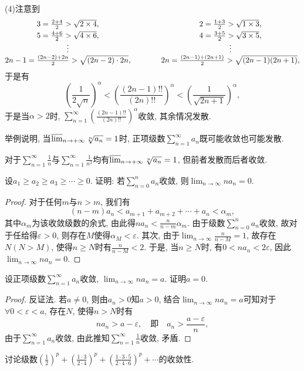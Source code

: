 \begin{quiza}
\begin{solution}
(4)注意到\[\begin{matrix}\vspace{3pt}
3=\frac{2+4}{2}>\sqrt{2\times 4},&\qquad &2=\frac{1+3}{2}>\sqrt{1\times 3},\\
5=\frac{4+6}{2}>\sqrt{4\times 6},&\qquad &4=\frac{3+5}{2}>\sqrt{3\times 5},\\
\vdots&\qquad&\vdots\\
2n-1=\frac{(2n-2)+2n}{2}>\sqrt{(2n-2)\cdot 2n},&\qquad&2n=\frac{(2n-1)+(2n+1)}{2}>\sqrt{(2n-1)(2n+1)},
\end{matrix}\]于是有\[\left(\frac{1}{2\sqrt{n}}\right)^\alpha<\left(\frac{(2n-1)!!}{(2n)!!}\right)^{\alpha}<\left(\frac{1}{\sqrt{2n+1}}\right)^\alpha,\]于是当\(\alpha>2\)时, \(\sum_{n=1}^{\infty}\left(\frac{(2n-1)!!}{(2n)!!}\right)^{\alpha}\)收敛, 其余情况发散.
\end{solution}
\woe 举例说明, 当\(\varlimsup_{n\rightarrow+\infty}\sqrt[n]{a_n}=1\)时,  正项级数\(\sum_{n=1}^{\infty}a_n\)既可能收敛也可能发散.
\begin{solution}
对于\(\sum_{n=1}^{\infty}\frac{1}{n}\)与\(\sum_{n=1}^{\infty}\frac{1}{n^2}\)均有\(\varlimsup_{n\rightarrow+\infty}\sqrt[n]{a_n}=1\), 但前者发散而后者收敛.
\end{solution}
\woe 设\(a_1\geqslant a_2\geqslant a_3\geqslant\cdots\geqslant 0\). 证明: 若\(\sum_{n=0}^{n}a_n\)收敛, 则\(\lim_{n\rightarrow\infty}na_n=0.\)
\begin{proof}
对于任何\(m\)与\(n>m\), 我们有\[(n-m)a_n<a_{m+1}+a_{m+2}+\cdots+a_n<\alpha_m,\]其中\(\alpha_m\)为该收敛级数的余式, 由此得\(na_n<\frac{n}{n-m}\alpha_m.\) 由于级数\(\sum_{n=0}^{n}a_n\)收敛, 故对于任给得\(\varepsilon>0\), 则存在\(M\)使得\(\alpha_{M}<\varepsilon\). 其次, 由于\(\lim_{n\rightarrow\infty}\frac{n}{n-M}=1\), 故存在\(N(N>M)\), 使得\(n\geqslant N\)时有\(\frac{n}{n-M}<2\). 于是, 当\(n\geqslant N\)时, 有\(0<na_n<2\varepsilon\), 因此\(\lim_{n\rightarrow\infty}na_n=0.\)
\end{proof}
\woe 设正项级数\(\sum_{n=1}^{\infty}a_n\)收敛, \(\lim_{n\rightarrow\infty}na_n=a\). 证明\(a=0\).
\begin{proof}
反证法. 若\(a\ne 0\), 则由\(a_n>0\)知\(a>0\), 结合\(\lim_{n\rightarrow\infty}na_n=a\)可知对于\(\forall 0<\varepsilon<a\), 存在\(N\), 使得\(n>N\)时有\[na_n>a-\varepsilon,\quad\text{即}\quad a_n>\frac{a-\varepsilon}{n},\]由于\(\sum_{n=1}^{\infty}a_n\)收敛, 由此推知\(\sum_{n=1}^{\infty}\frac{1}{n}\)收敛, 矛盾.
\end{proof}
\woe 讨论级数\(\left(\frac{1}{2}\right)^p+\left(\frac{1\cdot 3}{2\cdot 4}\right)^p+\left(\frac{1\cdot 3\cdot 5}{2\cdot 4\cdot 6}\right)^p+\cdots\)的收敛性.

\end{quiza}
